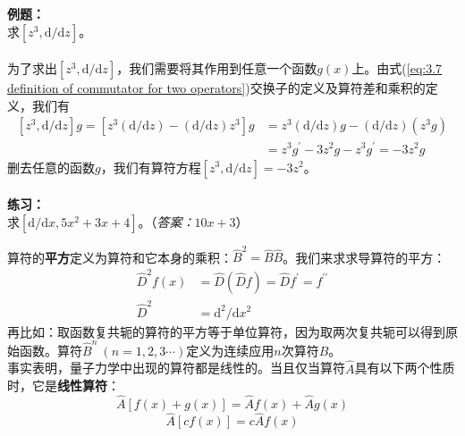	\begin{examplebox}
		\textbf{例题：}\\
		求$\left[z^3,\mathrm{d}/\mathrm{d}z\right]$。\\
		\\
		\indent 为了求出$\left[z^3,\mathrm{d}/\mathrm{d}z\right]$，我们需要将其作用到任意一个函数$g\left(x\right)$上。由式(\ref{eq:3.7 definition of commutator for two operators})交换子的定义及算符差和乘积的定义，我们有
		\begin{equation*}
			\begin{aligned}
				\left[z^3,\mathrm{d}/\mathrm{d}z\right]g = \left[z^3\left(\mathrm{d}/\mathrm{d}z\right) - \left(\mathrm{d}/\mathrm{d}z\right)z^3\right]g & = z^3\left(\mathrm{d}/\mathrm{d}z\right)g - \left(\mathrm{d}/\mathrm{d}z\right)\left(z^3g\right) \\
				& = z^3g^{\prime} - 3z^2g-z^3g^{\prime} = -3z^2g
			\end{aligned}
		\end{equation*}
		删去任意的函数$g$，我们有算符方程$\left[z^3,\mathrm{d}/\mathrm{d}z\right] = -3z^2$。\\
		\\
		\textbf{练习：}\\
		求$\left[\mathrm{d}/\mathrm{d}x, 5x^2+3x+4\right]$。（\textit{答案：}$10x+3$）
	\end{examplebox}
	\indent 算符的\textbf{平方}定义为算符和它本身的乘积：$\hat{B}^2 = \hat{B}\hat{B}$。我们来求求导算符的平方：
	\begin{equation*}
		\begin{aligned}
			\hat{D}^2f\left(x\right) & = \hat{D}\left(\hat{D}f\right) = \hat{D}f^{\prime} = f^{\prime \prime} \\
			\hat{D}^2& = \mathrm{d}^2/\mathrm{d}x^2
		\end{aligned}
	\end{equation*}
	再比如：取函数复共轭的算符的平方等于单位算符，因为取两次复共轭可以得到原始函数。算符$\hat{B}^n \: \left(n = 1,2,3\cdots\right)$定义为连续应用$n$次算符$\hat{B}$。\\
	\indent 事实表明，量子力学中出现的算符都是线性的。当且仅当算符$\hat{A}$具有以下两个性质时，它是\textbf{线性算符}：
	\begin{equation}
		\boxed{
			\hat{A}\left[f\left(x\right)+g\left(x\right)\right] = \hat{A}f\left(x\right)+\hat{A}g\left(x\right)
		}
		\label{eq:3.9}
	\end{equation}
	\begin{equation}
		\boxed{
			\hat{A}\left[cf\left(x\right)\right] = c\hat{A}f\left(x\right)
		}
		\label{eq:3.10}
	\end{equation}
